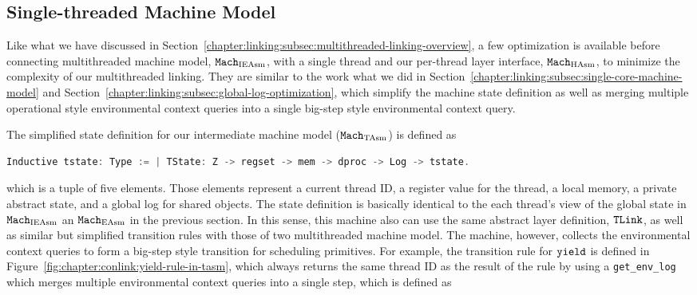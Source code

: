 
\subsection{Single-threaded Machine Model}
\label{chapter:linking:subsec:single-threaded-machine-model}
Like what we have discussed in Section~\ref{chapter:linking:subsec:multithreaded-linking-overview},
a few optimization is available 
before connecting multithreaded machine model,  ${\mathrm{\texttt{Mach}}}_{\mathrm{IEAsm}}$, with a single thread 
and our per-thread layer interface, ${\mathrm{\texttt{Mach}}}_{\mathrm{HAsm}}$, to minimize the complexity of our multithreaded linking. 
They are similar to the work what we did in  Section~\ref{chapter:linking:subsec:single-core-machine-model} and
Section~\ref{chapter:linking:subsec:global-log-optimization},
which simplify the machine state definition as 
well as merging multiple operational style environmental context queries into a single big-step style 
environmental context query.  
%
%


The simplified state definition for our intermediate machine model (${\mathrm{\texttt{Mach}}}_{\mathrm{TAsm}}$) is  defined as
\begin{lstlisting}[language=C]
Inductive tstate: Type := | TState: Z -> regset -> mem -> dproc -> Log -> tstate.
\end{lstlisting}
which is a tuple of five elements. 
Those elements represent a current thread ID, 
a register value for the thread, a local memory, a private abstract state, and a global log for shared objects. 
The state definition is basically 
identical to the each thread's view of the global state 
in ${\mathrm{\texttt{Mach}}}_{\mathrm{IEAsm}}$ an ${\mathrm{\texttt{Mach}}}_{\mathrm{EAsm}}$ in the previous section. 
In this sense, 
this machine also can use the same abstract layer definition, ${{\mathrm{\texttt{TLink}}}}$, 
as well as similar but simplified transition rules with those of two multithreaded machine model.
The machine, however,
 collects the environmental context queries 
 to form a big-step style transition for scheduling primitives. 
 For example, 
 the transition rule for ${\mathrm{\texttt{yield}}}$ is defined in Figure~\ref{fig:chapter:conlink:yield-rule-in-tasm},
 which always returns the same thread ID as the result of the rule 
 by using 
 a \lstinline$get_env_log$ which merges multiple environmental context queries into a single step,
 which is defined as

